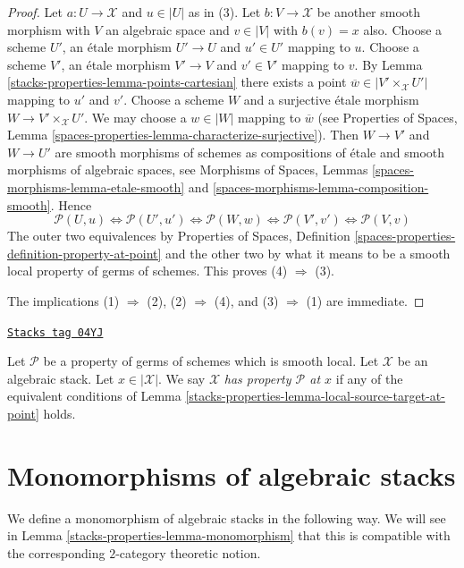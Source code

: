 \begin{proof}
Let $a : U \to \mathcal{X}$ and $u \in |U|$ as in (3). Let
$b : V \to \mathcal{X}$ be another smooth morphism with $V$ an algebraic
space and $v \in |V|$ with $b(v) = x$ also.
Choose a scheme $U'$, an \'etale morphism $U' \to U$ and $u' \in U'$
mapping to $u$. Choose a scheme $V'$, an \'etale morphism $V' \to V$
and $v' \in V'$ mapping to $v$. By
Lemma \ref{stacks-properties-lemma-points-cartesian}
there exists a point $\overline{w} \in |V' \times_\mathcal{X} U'|$
mapping to $u'$ and $v'$. Choose a scheme $W$ and a surjective \'etale
morphism $W \to V' \times_\mathcal{X} U'$. We may choose a
$w \in |W|$ mapping to $\overline{w}$ (see
Properties of Spaces,
Lemma \ref{spaces-properties-lemma-characterize-surjective}).
Then $W \to V'$ and $W \to U'$ are smooth morphisms of schemes
as compositions of \'etale and smooth morphisms of algebraic spaces, see
Morphisms of Spaces, Lemmas \ref{spaces-morphisms-lemma-etale-smooth} and
\ref{spaces-morphisms-lemma-composition-smooth}.
Hence
$$
\mathcal{P}(U, u)
\Leftrightarrow
\mathcal{P}(U', u')
\Leftrightarrow
\mathcal{P}(W, w)
\Leftrightarrow
\mathcal{P}(V', v')
\Leftrightarrow
\mathcal{P}(V, v)
$$
The outer two equivalences by
Properties of Spaces,
Definition \ref{spaces-properties-definition-property-at-point}
and the other two by what it means to be a smooth local property
of germs of schemes. This proves (4) $\Rightarrow$ (3).

\medskip\noindent
The implications (1) $\Rightarrow$ (2), (2) $\Rightarrow$ (4),
and (3) $\Rightarrow$ (1) are immediate.
\end{proof}

\begin{definition}
\label{stacks-properties-definition-property-at-point}
\href{https://stacks.math.columbia.edu/tag/04YJ}{\texttt{Stacks tag 04YJ}}

Let $\mathcal{P}$ be a property of germs of schemes which is
smooth local. Let $\mathcal{X}$ be an algebraic stack.
Let $x \in |\mathcal{X}|$.
We say $\mathcal{X}$ {\it has property $\mathcal{P}$ at $x$}
if any of the equivalent conditions of
Lemma \ref{stacks-properties-lemma-local-source-target-at-point}
holds.
\end{definition}

\section{Monomorphisms of algebraic stacks}
\label{stacks-properties-section-monomorphisms}
We define a monomorphism of algebraic stacks in the following way.
We will see in
Lemma \ref{stacks-properties-lemma-monomorphism}
that this is compatible with the corresponding $2$-category theoretic notion.

